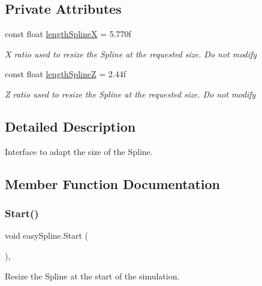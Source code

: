 \subsection*{Private Attributes}
\begin{DoxyCompactItemize}
\item 
const float \hyperlink{classeasySpline_aa1cda6cd9ba7feb7251b526a320f0680}{length\+SplineX} = 5.\+770f
\begin{DoxyCompactList}\small\item\em X ratio used to resize the Spline at the requested size. Do not modify\end{DoxyCompactList}\item 
const float \hyperlink{classeasySpline_ada978fd8ee35f377dd8a46d6b736bf90}{length\+SplineZ} = 2.\+44f
\begin{DoxyCompactList}\small\item\em Z ratio used to resize the Spline at the requested size. Do not modify\end{DoxyCompactList}\end{DoxyCompactItemize}


\subsection{Detailed Description}
Interface to adapt the size of the Spline. 



\subsection{Member Function Documentation}
\mbox{\label{classeasySpline_aab9181ebea3a8c3ff1ee0503a282006f}} 
\subsubsection{\texorpdfstring{Start()}{Start()}}
{\footnotesize\ttfamily void easy\+Spline.\+Start (\begin{DoxyParamCaption}{ }\end{DoxyParamCaption})\hspace{0.3cm}{\ttfamily [inline]}, {\ttfamily [private]}}



Resize the Spline at the start of the simulation. 



